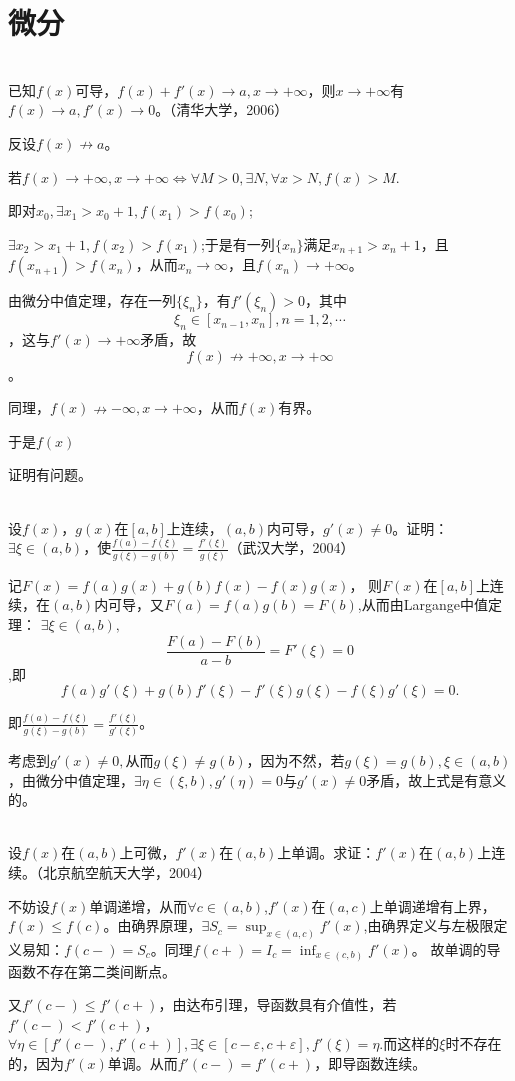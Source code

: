 \section{微分}
  \begin{example}
  \hfill\\
   已知$f(x)$可导，$f(x)+f'(x)\rightarrow a,x\rightarrow+\infty$，则$x\rightarrow+\infty$有$f(x)\rightarrow a,f'(x)\rightarrow0$。（清华大学，2006）
  
  反设$f(x)\nrightarrow a$。
  
  若$f(x)\rightarrow+\infty,x\rightarrow+\infty\Leftrightarrow\forall M>0,\exists N,\forall x>N,f(x)>M.$
  
  即对$x_0,\exists x_1>x_0+1,f(x_1)>f(x_0)$;
  
  $\exists x_2>x_1+1,f(x_2)>f(x_1)$;于是有一列$\{x_n\}$满足$x_{n+1}>x_n+1$，且$f(x_{n+1})>f(x_n)$，从而$x_n\rightarrow\infty$，且$f(x_n)\rightarrow+\infty$。
  
  由微分中值定理，存在一列$\{\xi_n\}$，有$f'(\xi_n)>0$，其中$$\xi_n\in[x_{n-1},x_n],n=1,2,\cdots$$，这与$f'(x)\rightarrow+\infty$矛盾，故$$f(x)\nrightarrow+\infty,x\rightarrow+\infty$$。
  
  同理，$f(x)\nrightarrow-\infty,x\rightarrow+\infty$，从而$f(x)$有界。
  
  于是$f(x)$
  
  证明有问题。
  \end{example}
  \begin{example}
  \hfill\\
   设$f(x)$，$g(x)$在$[a,b]$上连续，$(a,b)$内可导，$g'(x)\neq0$。证明：$\exists\xi\in(a,b)$，使$\frac{f(a)-f(\xi)}{g(\xi)-g(b)}=\frac{f'(\xi)}{g(\xi)}$（武汉大学，2004）
  
  记$F(x)=f(a)g(x)+g(b)f(x)-f(x)g(x)$，
  则$F(x)$在$[a,b]$上连续，在$(a,b)$内可导，又$F(a)=f(a)g(b)=F(b)$,从而由Largange中值定理：
  $\exists\xi\in(a,b),$$$\frac{F(a)-F(b)}{a-b}=F'(\xi)=0$$,即$$f(a)g'(\xi)+g(b)f'(\xi)-f'(\xi)g(\xi)-f(\xi)g'(\xi)=0.$$
  
  即$\frac{f(a)-f(\xi)}{g(\xi)-g(b)}=\frac{f'(\xi)}{g'(\xi)}$。
  
  考虑到$g'(x)\neq 0,$从而$g(\xi)\neq g(b)$，因为不然，若$g(\xi)=g(b),\xi\in(a,b)$，由微分中值定理，$\exists\eta\in(\xi,b),g'(\eta)=0$与$g'(x)\neq0$矛盾，故上式是有意义的。
  \end{example}
  \begin{example}
  \hfill\\
   设$f(x)$在$(a,b)$上可微，$f'(x)$在$(a,b)$上单调。求证：$f'(x)$在$(a,b)$上连续。（北京航空航天大学，2004）
  
  不妨设$f(x)$单调递增，从而$\forall c\in(a,b)$,$f'(x)$在$(a,c)$上单调递增有上界，$f(x)\leq f(c)$。由确界原理，$\exists S_c=\sup_{x\in(a,c)}f'(x)$,由确界定义与左极限定义易知：$f(c-)=S_c$。同理$f(c+)=I_c=\inf_{x\in(c,b)}f'(x)$。
  故单调的导函数不存在第二类间断点。
  
  又$f'(c-)\leq f'(c+)$，由达布引理，导函数具有介值性，若$f'(c-)<f'(c+)$，$\forall\eta\in[f'(c-),f'(c+)],\exists\xi\in[c-\varepsilon,c+\varepsilon],f'(\xi)=\eta.$而这样的$\xi$时不存在的，因为$f'(x)$单调。从而$f'(c-)=f'(c+)$，即导函数连续。
  \end{example}
